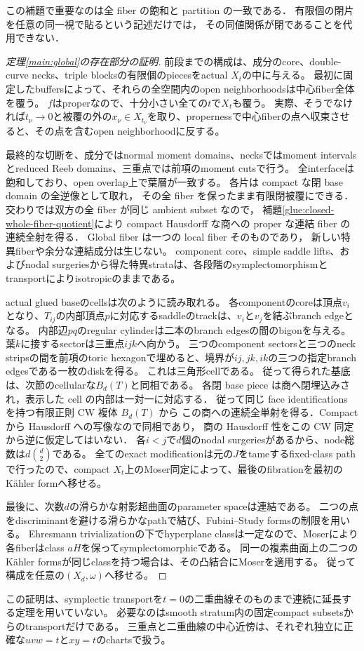 この補題で重要なのは全 fiber の飽和と partition の一致である．
有限個の閉片を任意の同一視で貼るという記述だけでは，
その同値関係が閉であることを代用できない．

\begin{proof}[定理\ref{main:global}の存在部分の証明]
前段までの構成は、成分のcore、double-curve necks、triple blocksの有限個のpiecesをactual $X_t$の中に与える。
最初に固定したbuffersによって、それらの全空間内のopen neighborhoodsは中心fiber全体を覆う。
$f$はproperなので、十分小さい全ての$t$で$X_t$も覆う。
実際、そうでなければ$t_\nu\to0$と被覆の外の$x_\nu\in X_{t_\nu}$を取り、propernessで中心fiberの点へ収束させると、その点を含むopen neighborhoodに反する。

最終的な切断を、成分ではnormal moment domains、necksではmoment intervalsとreduced Reeb domains、三重点では前項のmoment cutsで行う。
全interfaceは飽和しており、open overlap上で葉層が一致する。
各片は compact な閉 base domain の全逆像として取れ，
その全 fiber を保ったまま有限閉被覆にできる．
交わりでは双方の全 fiber が同じ ambient subset なので，
補題\ref{glue:closed-whole-fiber-quotient}により
compact Hausdorff な商への proper な連結 fiber の連続全射を得る．
Global fiber は一つの local fiber そのものであり，
新しい特異fiberや余分な連結成分は生じない。
component core、simple saddle lifts、およびnodal surgeriesから得た特異strataは、各段階のsymplectomorphismとtransportによりisotropicのままである。

actual glued baseのcellsは次のように読み取れる。
各componentのcoreは頂点$v_i$となり、$T_{ij}$の内部頂点$p$に対応するsaddleのtrackは、$v_i$と$v_j$を結ぶbranch edgeとなる。
内部辺$pq$のregular cylinderは二本のbranch edgesの間のbigonを与える。
葉$k$に接するsectorは三重点$ijk$へ向かう。
三つのcomponent sectorsと三つのneck stripsの間を前項のtoric hexagonで埋めると、境界が$ij,jk,ik$の三つの指定branch edgesである一枚のdiskを得る。
これは三角形cellである。
従って得られた基底は、次節のcellularな$B_d(T)$と同相である。
各閉 base piece は商へ閉埋込みされ，表示した cell の内部は一対一に対応する．
従って同じ face identifications を持つ有限正則 CW 複体 $B_d(T)$ から
この商への連続全単射を得る．Compact から Hausdorff への写像なので同相であり，
商の Hausdorff 性をこの CW 同定から逆に仮定してはいない．
各$i<j$で$d$個のnodal surgeriesがあるから、node総数は$d\binom d2$である。
全てのexact modificationは元の$J$をtameするfixed-class pathで行ったので、compact $X_t$上のMoser同定によって、最後のfibrationを最初のKähler formへ移せる。

最後に、次数$d$の滑らかな射影超曲面のparameter spaceは連結である。
二つの点をdiscriminantを避ける滑らかなpathで結び、Fubini--Study formsの制限を用いる。
Ehresmann trivializationの下でhyperplane classは一定なので、Moserにより各fiberはclass $aH$を保ってsymplectomorphicである。
同一の複素曲面上の二つのKähler formsが同じclassを持つ場合は、その凸結合にMoserを適用する。
従って構成を任意の$(X_d,\omega)$へ移せる。
\end{proof}

\begin{remark}
この証明は、symplectic transportを$t=0$の二重曲線そのものまで連続に延長する定理を用いていない。
必要なのはsmooth stratum内の固定compact subsetsからのtransportだけである。
三重点と二重曲線の中心近傍は、それぞれ独立に正確な$uvw=t$と$xy=t$のchartsで扱う。
\end{remark}
